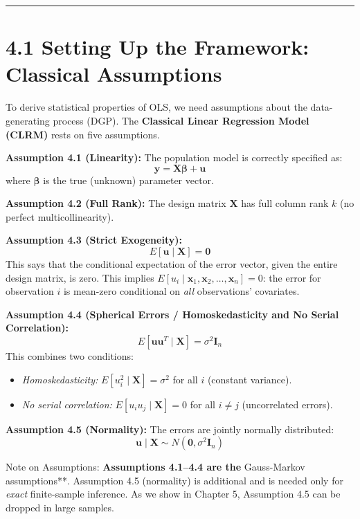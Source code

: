 \medskip\hrule\medskip

\section{4.1 Setting Up the Framework: Classical Assumptions}

To derive statistical properties of OLS, we need assumptions about the data-generating process (DGP). The \textbf{Classical Linear Regression Model (CLRM)} rests on five assumptions.

\textbf{Assumption 4.1 (Linearity):} The population model is correctly specified as:
\[
\mathbf{y} = \mathbf{X}\boldsymbol{\beta} + \mathbf{u}
\]
where $\boldsymbol{\beta}$ is the true (unknown) parameter vector.

\textbf{Assumption 4.2 (Full Rank):} The design matrix $\mathbf{X}$ has full column rank $k$ (no perfect multicollinearity).

\textbf{Assumption 4.3 (Strict Exogeneity):}
\[
E[\mathbf{u} \mid \mathbf{X}] = \mathbf{0}
\]
This says that the conditional expectation of the error vector, given the entire design matrix, is zero. This implies $E[u_i \mid \mathbf{x}_1, \mathbf{x}_2, \ldots, \mathbf{x}_n] = 0$: the error for observation $i$ is mean-zero conditional on \textit{all} observations' covariates.

\textbf{Assumption 4.4 (Spherical Errors / Homoskedasticity and No Serial Correlation):}
\[
E[\mathbf{u}\mathbf{u}^T \mid \mathbf{X}] = \sigma^2 \mathbf{I}_n
\]
This combines two conditions:
\begin{itemize}
\item \textit{Homoskedasticity:} $E[u_i^2 \mid \mathbf{X}] = \sigma^2$ for all $i$ (constant variance).
\item \textit{No serial correlation:} $E[u_i u_j \mid \mathbf{X}] = 0$ for all $i \neq j$ (uncorrelated errors).
\end{itemize}

\textbf{Assumption 4.5 (Normality):} The errors are jointly normally distributed:
\[
\mathbf{u} \mid \mathbf{X} \sim N(\mathbf{0}, \sigma^2 \mathbf{I}_n)
\]

\begin{keybox}{Note on Assumptions:\textbf{ Assumptions 4.1--4.4 are the }Gauss-Markov assumptions**. Assumption 4.5 (normality) is additional and is needed only for \textit{exact} finite-sample inference. As we show in Chapter 5, Assumption 4.5 can be dropped in large samples.}
\end{keybox}

